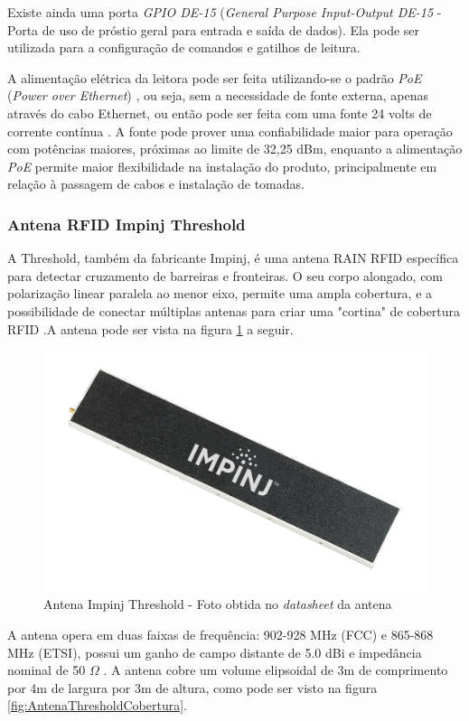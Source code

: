  Existe ainda uma porta \textit{GPIO DE-15} (\textit{General Purpose Input-Output DE-15} - Porta de uso de próstio geral para entrada e saída de dados)\cite{SpeedwayRUserManual}. Ela pode ser utilizada para a configuração de comandos e gatilhos de leitura.
 
 A alimentação elétrica da leitora pode ser feita utilizando-se o padrão \textit{PoE} (\textit{Power over Ethernet}) \cite{SpeedwayRUserManual}, ou seja, sem a necessidade de fonte externa, apenas através do cabo Ethernet, ou então pode ser feita com uma fonte 24 volts de corrente contínua \cite{IEEE-SA-POE}. A fonte pode prover uma confiabilidade maior para operação com potências maiores, próximas ao limite de 32,25 dBm, enquanto a alimentação \textit{PoE} permite maior flexibilidade na instalação do produto, principalmente em relação à passagem de cabos e instalação de tomadas.
 
 \subsubsection{Antena RFID Impinj Threshold}
 
 A Threshold, também da fabricante Impinj, é uma antena RAIN RFID específica para detectar cruzamento de barreiras e fronteiras. O seu corpo alongado, com polarização linear paralela ao menor eixo, permite uma ampla cobertura, e a possibilidade de conectar múltiplas antenas para criar uma "cortina" de cobertura RFID \cite{AntenaThresholdDatasheet}.A antena pode ser vista na figura \ref{fig:AntenaThreshold_first} a seguir.
 
 \begin{figure}[H]
    \centering
    \includegraphics[width=0.5\linewidth]{figs/Metodologia/impinj_Threshold.png}
    \caption{Antena Impinj Threshold - Foto obtida no \textit{datasheet} da antena \cite{AntenaThresholdDatasheet}}
    \label{fig:AntenaThreshold_first}
\end{figure}
 
 A antena opera em duas faixas de frequência: 902-928 MHz (FCC) e 865-868 MHz (ETSI), possui um ganho de campo distante de 5.0 dBi e impedância nominal de 50 $\Omega$ \cite{AntenaThresholdDatasheet}. A antena cobre um volume elipsoidal de 3m de comprimento por 4m de largura por 3m de altura, como pode ser visto na figura \ref{fig:AntenaThresholdCobertura}.
 
